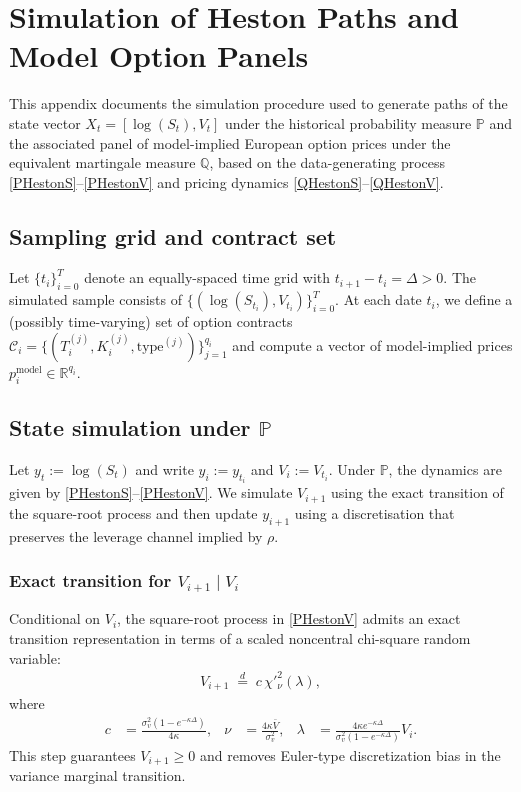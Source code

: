 \documentclass[11pt,a4paper,notitlepage]{article}
\numberwithin{equation}{section}
\begin{document}
\newpage
\appendix
\section{Simulation of Heston Paths and Model Option Panels}
\label{app:sim_heston}

This appendix documents the simulation procedure used to generate paths of the state vector
$X_t=[\log(S_t),V_t]$ under the historical probability measure $\mathbb{P}$ and the associated
panel of model-implied European option prices under the equivalent martingale measure $\mathbb{Q}$,
based on the data-generating process \eqref{PHestonS}--\eqref{PHestonV} and pricing dynamics
\eqref{QHestonS}--\eqref{QHestonV}.

\subsection{Sampling grid and contract set}
Let $\{t_i\}_{i=0}^T$ denote an equally-spaced time grid with $t_{i+1}-t_i=\Delta>0$.
The simulated sample consists of $\{(\log(S_{t_i}),V_{t_i})\}_{i=0}^T$.
At each date $t_i$, we define a (possibly time-varying) set of option contracts
$\mathcal{C}_i=\{(T_i^{(j)},K_i^{(j)},\mathrm{type}^{(j)})\}_{j=1}^{q_i}$ and compute a vector of
model-implied prices $p_i^{\mathrm{model}}\in\mathbb{R}^{q_i}$.

\subsection{State simulation under $\mathbb{P}$}
Let $y_t:=\log(S_t)$ and write $y_i:=y_{t_i}$ and $V_i:=V_{t_i}$. Under $\mathbb{P}$,
the dynamics are given by \eqref{PHestonS}--\eqref{PHestonV}.
We simulate $V_{i+1}$ using the exact transition of the square-root process and then update $y_{i+1}$
using a discretisation that preserves the leverage channel implied by $\rho$.

\subsubsection{Exact transition for $V_{i+1}\mid V_i$}
Conditional on $V_i$, the square-root process in \eqref{PHestonV} admits an exact transition
representation in terms of a scaled noncentral chi-square random variable:
\begin{align}
V_{i+1} \;\overset{d}{=}\; c\,\chi'^2_{\nu}(\lambda),
\label{eq:CIR_exact}
\end{align}
where
\begin{align}
c &= \frac{\sigma_v^2\left(1-e^{-\kappa \Delta}\right)}{4\kappa}, &
\nu &= \frac{4\kappa \bar{V}}{\sigma_v^2}, &
\lambda &= \frac{4\kappa e^{-\kappa \Delta}}{\sigma_v^2\left(1-e^{-\kappa \Delta}\right)}V_i.
\label{eq:CIR_exact_params}
\end{align}
This step guarantees $V_{i+1}\geq 0$ and removes Euler-type discretization bias in the variance
marginal transition.
\end{document}
